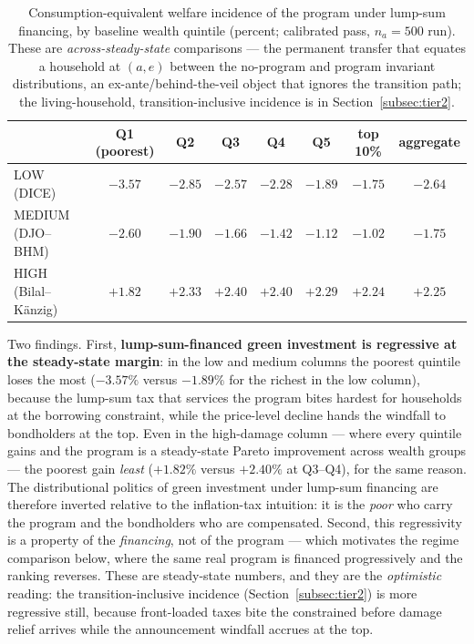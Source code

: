 \documentclass[12pt]{article}
\begin{document}
\begin{table}[!htb]
\centering
\caption{Consumption-equivalent welfare incidence of the program under
lump-sum financing, by baseline wealth quintile (percent;
calibrated pass, $n_a=500$ run). These are \emph{across-steady-state}
comparisons --- the permanent transfer that equates a household at
$(a,e)$ between the no-program and program invariant distributions, an
ex-ante/behind-the-veil object that ignores the transition path; the
living-household, transition-inclusive incidence is in
Section~\ref{subsec:tier2}.}
\label{tab:incidence}
\small
\setlength{\tabcolsep}{4.5pt}
\begin{tabular}{lccccccc}
\toprule
 & Q1 (poorest) & Q2 & Q3 & Q4 & Q5 & top 10\% & aggregate \\
\midrule
LOW (DICE)          & $-3.57$ & $-2.85$ & $-2.57$ & $-2.28$ & $-1.89$ & $-1.75$ & $-2.64$ \\
MEDIUM (DJO--BHM)   & $-2.60$ & $-1.90$ & $-1.66$ & $-1.42$ & $-1.12$ & $-1.02$ & $-1.75$ \\
HIGH (Bilal--K\"anzig) & $+1.82$ & $+2.33$ & $+2.40$ & $+2.40$ & $+2.29$ & $+2.24$ & $+2.25$ \\
\bottomrule
\end{tabular}
\end{table}

Two findings. First, \textbf{lump-sum-financed green investment is regressive
at the steady-state margin}: in the low and medium columns the poorest
quintile loses the most ($-3.57\%$ versus $-1.89\%$ for the richest in the
low column), because the lump-sum tax that services the program bites
hardest for households at the borrowing constraint, while the price-level
decline hands the windfall to bondholders at the top. Even in the
high-damage column --- where every quintile gains and the program is a
steady-state Pareto improvement across wealth groups --- the poorest gain
\emph{least} ($+1.82\%$ versus $+2.40\%$ at Q3--Q4), for the same reason. The
distributional politics of green investment under lump-sum financing are
therefore inverted relative to the inflation-tax intuition: it is the
\emph{poor} who carry the program and the bondholders who are compensated.
Second, this regressivity is a property of the \emph{financing}, not of the
program --- which motivates the regime comparison below, where the same real
program is financed progressively and the ranking reverses. These are
steady-state numbers, and they are the \emph{optimistic} reading: the
transition-inclusive incidence (Section~\ref{subsec:tier2}) is more
regressive still, because front-loaded taxes bite the constrained before
damage relief arrives while the announcement windfall accrues at the top.
\end{document}
